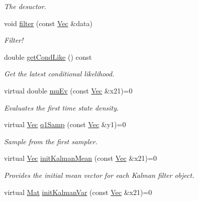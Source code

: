 \begin{DoxyCompactItemize}
\begin{DoxyCompactList}\small\item\em The desuctor. \end{DoxyCompactList}\item 
void \hyperlink{classKalman__RBPF_a72d5ed61d0289a6977bf178145f5b969}{filter} (const \hyperlink{apf__filter_8h_a4c7df05c6f5e8a0d15ae14bcdbc07152}{Vec} \&data)
\begin{DoxyCompactList}\small\item\em Filter! \end{DoxyCompactList}\item 
double \hyperlink{classKalman__RBPF_a2d65ffce3d115ecaf1c8e97b9222cdde}{get\+Cond\+Like} () const 
\begin{DoxyCompactList}\small\item\em Get the latest conditional likelihood. \end{DoxyCompactList}\item 
virtual double \hyperlink{classKalman__RBPF_a25e8682d13a04eb1075a4d30dfa6825a}{mu\+Ev} (const \hyperlink{apf__filter_8h_a4c7df05c6f5e8a0d15ae14bcdbc07152}{Vec} \&x21)=0
\begin{DoxyCompactList}\small\item\em Evaluates the first time state density. \end{DoxyCompactList}\item 
virtual \hyperlink{apf__filter_8h_a4c7df05c6f5e8a0d15ae14bcdbc07152}{Vec} \hyperlink{classKalman__RBPF_a71e394c093f606f80a92a3fc4fe087a3}{q1\+Samp} (const \hyperlink{apf__filter_8h_a4c7df05c6f5e8a0d15ae14bcdbc07152}{Vec} \&y1)=0
\begin{DoxyCompactList}\small\item\em Sample from the first sampler. \end{DoxyCompactList}\item 
virtual \hyperlink{apf__filter_8h_a4c7df05c6f5e8a0d15ae14bcdbc07152}{Vec} \hyperlink{classKalman__RBPF_a870a53fc149adf8042fa12eb5d9a8d30}{init\+Kalman\+Mean} (const \hyperlink{apf__filter_8h_a4c7df05c6f5e8a0d15ae14bcdbc07152}{Vec} \&x21)=0
\begin{DoxyCompactList}\small\item\em Provides the initial mean vector for each Kalman filter object. \end{DoxyCompactList}\item 
virtual \hyperlink{apf__filter_8h_ae601f56a556993079f730483c574356f}{Mat} \hyperlink{classKalman__RBPF_a4f7f37a90d9382ca2ad7dfef4acf1bc0}{init\+Kalman\+Var} (const \hyperlink{apf__filter_8h_a4c7df05c6f5e8a0d15ae14bcdbc07152}{Vec} \&x21)=0

\end{DoxyCompactItemize}
